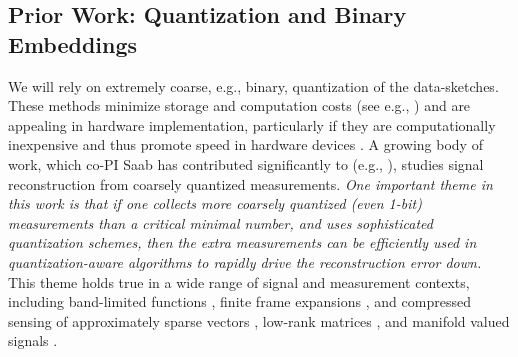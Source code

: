\subsection{Prior Work: Quantization and Binary Embeddings}\label{sec:quant}
We will rely on extremely
coarse, e.g., binary, quantization of the data-sketches. These methods minimize storage and computation costs (see e.g., \cite{fang2014sparse,boufounos20081}) and 
are appealing in hardware implementation, particularly if they are computationally inexpensive and thus promote speed in hardware devices  \cite{jacques2013robust,le2005analog}. A growing body of work, which co-PI Saab has contributed significantly to (e.g., \cite{SaabIEEEIT,knudson2016one,saab2018quantization,LybrandSaab2018,iwen2019new, daubechies2015deterministic}), studies signal reconstruction from coarsely quantized measurements. \emph{One important theme in this work is that if one collects more coarsely quantized (even 1-bit) measurements  than a critical minimal number, and uses sophisticated quantization schemes, then the extra measurements can be efficiently used in quantization-aware algorithms to rapidly drive the reconstruction error down.} %
This theme holds true in a wide range of signal and measurement contexts, including band-limited functions \cite{daubechies2015deterministic}, finite frame expansions \cite{iwen2013near},  and compressed sensing of approximately sparse vectors \cite{SaabIEEEIT, saab2018quantization}, low-rank matrices \cite{LybrandSaab2018}, and manifold valued signals \cite{iwen2019new}.

